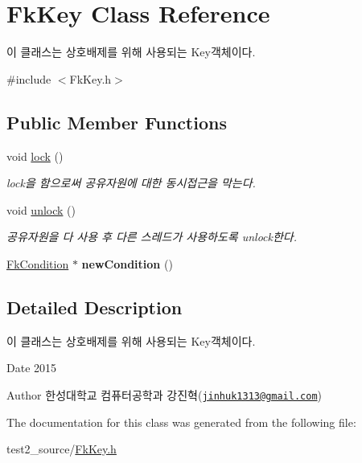 \hypertarget{class_fk_key}{}\section{Fk\+Key Class Reference}
\label{class_fk_key}


이 클래스는 상호배제를 위해 사용되는 Key객체이다.  




{\ttfamily \#include $<$Fk\+Key.\+h$>$}

\subsection*{Public Member Functions}
\begin{DoxyCompactItemize}
\item 
\hypertarget{class_fk_key_a50a83afba780fe7f02202ad0484760bb}{}void \hyperlink{class_fk_key_a50a83afba780fe7f02202ad0484760bb}{lock} ()\label{class_fk_key_a50a83afba780fe7f02202ad0484760bb}

\begin{DoxyCompactList}\small\item\em lock을 함으로써 공유자원에 대한 동시접근을 막는다. \end{DoxyCompactList}\item 
\hypertarget{class_fk_key_ac33b4df6d196f9e9c14aa1437d53ddfb}{}void \hyperlink{class_fk_key_ac33b4df6d196f9e9c14aa1437d53ddfb}{unlock} ()\label{class_fk_key_ac33b4df6d196f9e9c14aa1437d53ddfb}

\begin{DoxyCompactList}\small\item\em 공유자원을 다 사용 후 다른 스레드가 사용하도록 unlock한다. \end{DoxyCompactList}\item 
\hypertarget{class_fk_key_af60bc453b7a08c445422479d02dc1eb4}{}\hyperlink{class_fk_condition}{Fk\+Condition} $\ast$ {\bfseries new\+Condition} ()\label{class_fk_key_af60bc453b7a08c445422479d02dc1eb4}

\end{DoxyCompactItemize}


\subsection{Detailed Description}
이 클래스는 상호배제를 위해 사용되는 Key객체이다. 

\begin{DoxyDate}{Date}
2015 
\end{DoxyDate}
\begin{DoxyAuthor}{Author}
한성대학교 컴퓨터공학과 강진혁(\href{mailto:jinhuk1313@gmail.com}{\tt jinhuk1313@gmail.\+com}) 
\end{DoxyAuthor}


The documentation for this class was generated from the following file\+:\begin{DoxyCompactItemize}
\item 
test2\+\_\+source/\hyperlink{_fk_key_8h}{Fk\+Key.\+h}\end{DoxyCompactItemize}
